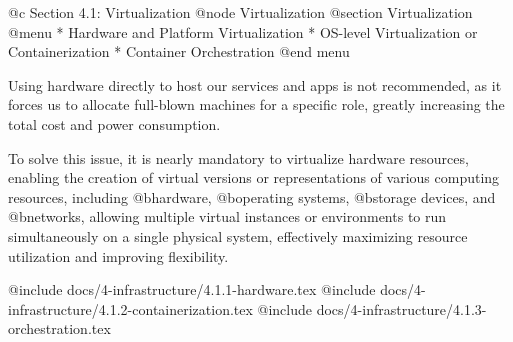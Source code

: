 @c Section 4.1: Virtualization
@node Virtualization
@section Virtualization
@menu
* Hardware and Platform Virtualization
* OS-level Virtualization or Containerization
* Container Orchestration
@end menu

Using hardware directly to host our services and apps is not recommended, as it forces us to allocate full-blown machines for a specific role, greatly increasing the total cost and power consumption.

To solve this issue, it is nearly mandatory to virtualize hardware resources, enabling the creation of virtual versions or representations of various computing resources, including @b{hardware}, @b{operating systems}, @b{storage devices}, and @b{networks}, allowing multiple virtual instances or environments to run simultaneously on a single physical system, effectively maximizing resource utilization and improving flexibility.

@include docs/4-infrastructure/4.1.1-hardware.tex
@include docs/4-infrastructure/4.1.2-containerization.tex
@include docs/4-infrastructure/4.1.3-orchestration.tex
